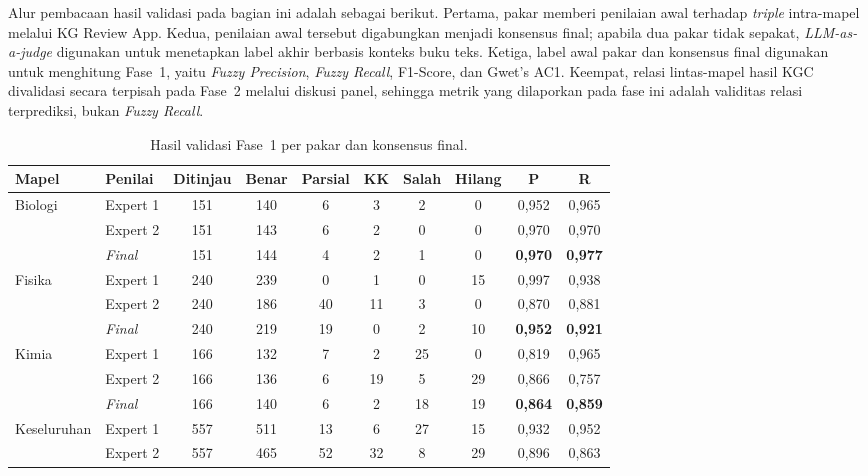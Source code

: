 \documentclass[../../thesis]{subfiles}
\begin{document}
Alur pembacaan hasil validasi pada bagian ini adalah sebagai berikut. Pertama,
pakar memberi penilaian awal terhadap \textit{triple} intra-mapel melalui KG
Review App. Kedua, penilaian awal tersebut digabungkan menjadi konsensus final;
apabila dua pakar tidak sepakat, \textit{LLM-as-a-judge} digunakan untuk
menetapkan label akhir berbasis konteks buku teks. Ketiga, label awal pakar dan
konsensus final digunakan untuk menghitung Fase~1, yaitu \textit{Fuzzy
Precision}, \textit{Fuzzy Recall}, F1-Score, dan Gwet's AC1. Keempat, relasi
lintas-mapel hasil KGC divalidasi secara terpisah pada Fase~2 melalui diskusi
panel, sehingga metrik yang dilaporkan pada fase ini adalah validitas relasi
terprediksi, bukan \textit{Fuzzy Recall}.

{\setlength{\tabcolsep}{4pt}
\begin{table}[htbp]
\centering
\caption{Hasil validasi Fase~1 per pakar dan konsensus final.}
\label{tab:validasi-mapel}
\begin{tabular}{@{}l l c c c c c c c c@{}}
\toprule
\textbf{Mapel} & \textbf{Penilai} & \textbf{Ditinjau} & \textbf{Benar} & \textbf{Parsial} & \textbf{KK} & \textbf{Salah} & \textbf{Hilang} & \textbf{P} & \textbf{R} \\
\midrule
Biologi  & Expert 1      & 151 & 140 & 6  & 3  & 2  & 0  & 0{,}952 & 0{,}965 \\
         & Expert 2      & 151 & 143 & 6  & 2  & 0  & 0  & 0{,}970 & 0{,}970 \\
         & \textit{Final}& 151 & 144 & 4  & 2  & 1  & 0  & \textbf{0{,}970} & \textbf{0{,}977} \\
\midrule
Fisika   & Expert 1      & 240 & 239 & 0  & 1  & 0  & 15 & 0{,}997 & 0{,}938 \\
         & Expert 2      & 240 & 186 & 40 & 11 & 3  & 0  & 0{,}870 & 0{,}881 \\
         & \textit{Final}& 240 & 219 & 19 & 0  & 2  & 10 & \textbf{0{,}952} & \textbf{0{,}921} \\
\midrule
Kimia    & Expert 1      & 166 & 132 & 7  & 2  & 25 & 0  & 0{,}819 & 0{,}965 \\
         & Expert 2      & 166 & 136 & 6  & 19 & 5  & 29 & 0{,}866 & 0{,}757 \\
         & \textit{Final}& 166 & 140 & 6  & 2  & 18 & 19 & \textbf{0{,}864} & \textbf{0{,}859} \\
\midrule
Keseluruhan & Expert 1   & 557 & 511 & 13 & 6  & 27 & 15 & 0{,}932 & 0{,}952 \\
            & Expert 2   & 557 & 465 & 52 & 32 & 8  & 29 & 0{,}896 & 0{,}863 \\

\end{tabular}
\end{table}}
\end{document}
